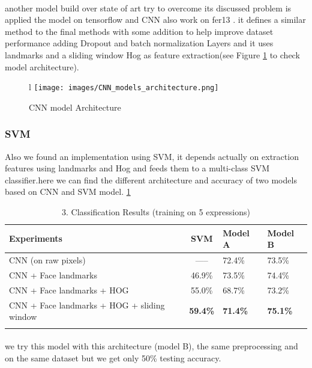 \paragraph{}
another model build over state of art try to overcome its discussed problem is applied the model on tensorflow and CNN also work on fer13 . it defines a similar method to the final methods with some addition to help improve dataset performance adding Dropout and batch normalization Layers and it uses landmarks and a sliding window Hog as feature extraction(see Figure \ref{amine_arch} to check model architecture). \newline 
\begin{figure}{l}
	\centering
	\texttt{[image: images/CNN\_models\_architecture.png]}
	\caption{CNN model Architecture}
	\label{amine_arch}
\end{figure}
\subsubsection{SVM}
Also we found an implementation using SVM, it depends actually on extraction features using landmarks and Hog and feeds them to a multi-class SVM classifier.here we can find the different architecture and accuracy of two models based on CNN and SVM model. \ref{amine}

\begin{table}[h!]
	\begin{center}
		\caption{3. Classification Results (training on 5 expressions)\newline}
		\label{amine}
		\begin{tabular}{l|c|l|l}
			\textbf{Experiments} & \textbf{SVM}   & \textbf{Model A}   & \textbf{Model B}  \\
			\hline
			CNN (on raw pixels)	& -----   & 72.4\% & 73.5\% \\ 
			CNN + Face landmarks & 46.9\% &	73.5\% & 74.4\% \\
			CNN + Face landmarks + HOG & 55.0\% & 68.7\% & 73.2\% \\
			CNN + Face landmarks + HOG + sliding window & \textbf{59.4\%} &\textbf{71.4\%}&\textbf{75.1\%}\\
			& & 
		\end{tabular}
		
	\end{center}
\end{table}


\paragraph{} we try this model with this architecture (model B), the same preprocessing and on the same dataset but we get only 50\% testing accuracy.

